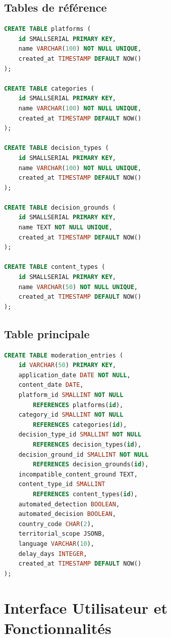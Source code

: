 \documentclass[10pt,twocolumn,a4paper]{article}
\begin{document}
\subsection{Tables de référence}

\begin{lstlisting}[language=SQL, caption={Définition des tables de référence}]
CREATE TABLE platforms (
    id SMALLSERIAL PRIMARY KEY,
    name VARCHAR(100) NOT NULL UNIQUE,
    created_at TIMESTAMP DEFAULT NOW()
);

CREATE TABLE categories (
    id SMALLSERIAL PRIMARY KEY,
    name VARCHAR(100) NOT NULL UNIQUE,
    created_at TIMESTAMP DEFAULT NOW()
);

CREATE TABLE decision_types (
    id SMALLSERIAL PRIMARY KEY,
    name VARCHAR(100) NOT NULL UNIQUE,
    created_at TIMESTAMP DEFAULT NOW()
);

CREATE TABLE decision_grounds (
    id SMALLSERIAL PRIMARY KEY,
    name TEXT NOT NULL UNIQUE,
    created_at TIMESTAMP DEFAULT NOW()
);

CREATE TABLE content_types (
    id SMALLSERIAL PRIMARY KEY,
    name VARCHAR(50) NOT NULL UNIQUE,
    created_at TIMESTAMP DEFAULT NOW()
);
\end{lstlisting}

\subsection{Table principale}

\begin{lstlisting}[language=SQL, caption={Table principale moderation\_entries}]
CREATE TABLE moderation_entries (
    id VARCHAR(50) PRIMARY KEY,
    application_date DATE NOT NULL,
    content_date DATE,
    platform_id SMALLINT NOT NULL 
        REFERENCES platforms(id),
    category_id SMALLINT NOT NULL 
        REFERENCES categories(id),
    decision_type_id SMALLINT NOT NULL 
        REFERENCES decision_types(id),
    decision_ground_id SMALLINT NOT NULL 
        REFERENCES decision_grounds(id),
    incompatible_content_ground TEXT,
    content_type_id SMALLINT 
        REFERENCES content_types(id),
    automated_detection BOOLEAN,
    automated_decision BOOLEAN,
    country_code CHAR(2),
    territorial_scope JSONB,
    language VARCHAR(10),
    delay_days INTEGER,
    created_at TIMESTAMP DEFAULT NOW()
);
\end{lstlisting}

\section{Interface Utilisateur et Fonctionnalités}
\end{document}
